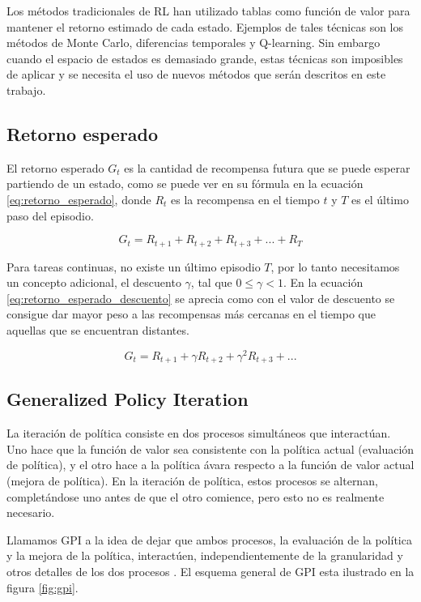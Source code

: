 Los métodos tradicionales de \ac{RL} han utilizado tablas como función de valor para mantener el retorno estimado de cada estado. Ejemplos de tales técnicas son los métodos de Monte Carlo, diferencias temporales y Q-learning. Sin embargo cuando el espacio de estados es demasiado grande, estas técnicas son imposibles de aplicar y se necesita el uso de nuevos métodos que serán descritos en este trabajo.


\subsection{Retorno esperado}

El retorno esperado $G_t$ es la cantidad de recompensa futura que se puede esperar partiendo de un estado, como se puede ver en su fórmula en la ecuación \eqref{eq:retorno_esperado}, donde $R_t$ es la recompensa en el tiempo $t$ y $T$ es el último paso del episodio.

\begin{equation} \label{eq:retorno_esperado}
G_t = R_{t+1} + R_{t+2} + R_{t+3} + ... + R_T
\end{equation}

Para tareas continuas, no existe un último episodio $T$, por lo tanto necesitamos un concepto adicional, el descuento $\gamma$, tal que $0 \leq \gamma < 1$. En la ecuación \eqref{eq:retorno_esperado_descuento} se aprecia como con el valor de descuento se consigue dar mayor peso a las recompensas más cercanas en el tiempo que aquellas que se encuentran distantes.

\begin{equation} \label{eq:retorno_esperado_descuento}
G_t = R_{t+1} + \gamma R_{t+2} + \gamma^2 R_{t+3} + ... 
\end{equation}


\subsection{Generalized Policy Iteration}

La iteración de política consiste en dos procesos simultáneos que interactúan. Uno hace que la función de valor sea consistente con la política actual (evaluación de política), y el otro hace a la política ávara respecto a la función de valor actual (mejora de política). En la iteración de política, estos procesos se alternan, completándose uno antes de que el otro comience, pero esto no es realmente necesario.

Llamamos \ac{GPI} a la idea de dejar que ambos procesos, la evaluación de la política y la mejora de la política, interactúen, independientemente de la granularidad y otros detalles de los dos procesos \cite{van1978discounted}. El esquema general de \ac{GPI} esta ilustrado en la figura \ref{fig:gpi}.

